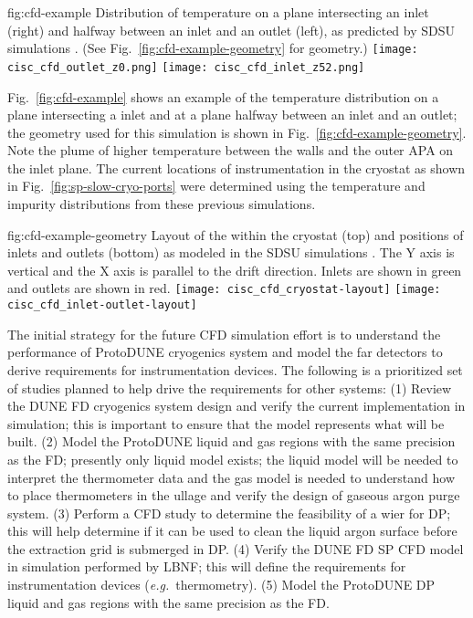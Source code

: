 \begin{dunefigure}{fig:cfd-example}
  {Distribution of temperature on a plane intersecting an inlet (right) and halfway between an inlet and an outlet (left), as predicted by SDSU  simulations \cite{docdb-5915}. (See Fig.\ \ref{fig:cfd-example-geometry} for geometry.)}
  \texttt{[image: cisc\_cfd\_outlet\_z0.png]}
  \texttt{[image: cisc\_cfd\_inlet\_z52.png]}
\end{dunefigure}

Fig.\ \ref{fig:cfd-example} shows an example of the temperature
distribution on a plane intersecting a  inlet and at a
plane halfway between an inlet and an outlet; the geometry used for
this simulation is shown in Fig.\ \ref{fig:cfd-example-geometry}.
Note the plume of higher temperature  between the walls and
the outer APA on the inlet plane.  The current locations of instrumentation in
the cryostat as shown in Fig.\ \ref{fig:sp-slow-cryo-ports} were
determined using the temperature and impurity distributions from these
previous simulations.

\begin{dunefigure}{fig:cfd-example-geometry}
  {Layout of the  within the cryostat (top) and positions of
     inlets and outlets (bottom) as modeled in the SDSU
     simulations \cite{docdb-5915}.
    The Y axis is vertical and the X axis is parallel to the 
    drift direction.
    Inlets are shown in green and outlets are shown in red.}
  \texttt{[image: cisc\_cfd\_cryostat-layout]}
  \texttt{[image: cisc\_cfd\_inlet-outlet-layout]}
\end{dunefigure}

The initial strategy for the future CFD simulation effort is to understand the performance of ProtoDUNE cryogenics system and model the far detectors to derive requirements for instrumentation devices.
The following is a prioritized set of studies planned to help drive the requirements for other systems:
(1) Review the DUNE FD cryogenics system design and verify the current implementation in simulation; this is important to ensure that the model represents what will be built.
(2) Model the ProtoDUNE liquid and gas regions with the same precision as the FD; presently only liquid model exists; the liquid model will be needed to interpret the thermometer data and the gas model is needed to understand how to place thermometers in the ullage and verify the design of gaseous argon purge system.
(3) Perform a CFD study to determine the feasibility of a wier for DP; this will help determine if it can be used to clean the liquid argon surface before the extraction grid is submerged in DP.
(4) Verify the DUNE FD SP CFD model in simulation performed by LBNF; this will define the requirements for instrumentation devices ({\em e.g.}\ thermometry).
(5) Model the ProtoDUNE DP liquid and gas regions with the same precision as the FD.
